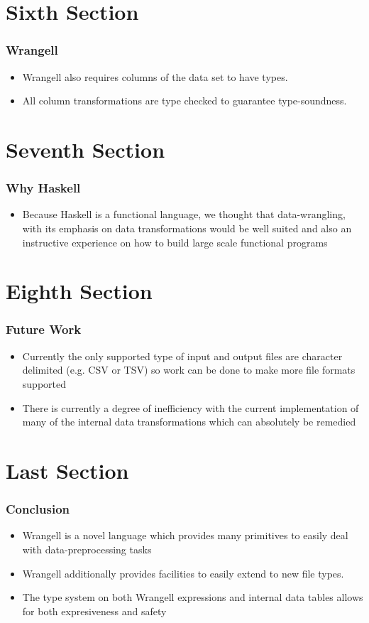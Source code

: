 \documentclass{beamer}
\begin{document}
\section{Sixth Section}
\begin{frame}
\frametitle{Wrangell}
\begin{itemize}
    \item<1> Wrangell also requires columns of the data set to have types.
    \item<1> All column transformations are type checked to guarantee type-soundness.
\end{itemize}
\end{frame}

\section{Seventh Section}
\begin{frame}
\frametitle{Why Haskell}
\begin{itemize}
    \item<1>  Because Haskell
is a functional language, we thought that data-wrangling,
with its emphasis on data transformations would be well suited and also an instructive experience on how to build large scale functional programs
\end{itemize}
\end{frame}

\section{Eighth Section}
\begin{frame}
\frametitle{Future Work}
\begin{itemize}
    \item<1> Currently the only supported type of input and output files are character delimited (e.g. CSV or TSV) so work can be done to make more file formats supported 
    \item<1> There is currently a degree of inefficiency with the current implementation of many of the internal data transformations which can absolutely be remedied 
\end{itemize}
\end{frame}



\section{Last Section}
\begin{frame}
\frametitle{Conclusion}
\begin{itemize}
    \item<1> Wrangell is a novel language which provides many primitives to easily deal with data-preprocessing tasks 
    \item<1> Wrangell additionally provides facilities to easily extend to new file types.
    \item<1> The type system on both Wrangell expressions and internal data tables allows for both expresiveness and safety 
\end{itemize}
\end{frame}
\end{document}
